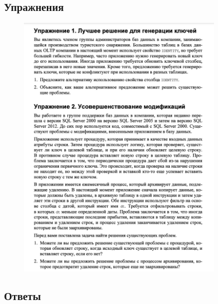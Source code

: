 \newpage
\subsection*{Упражнения}

\begin{figure}[h!]
	\begin{center}
		\includegraphics[width=0.9\textwidth]{img/ex17.png}
	\end{center}
	\captionsetup{justification=centering}
\end{figure}

\subsection*{Ответы}

